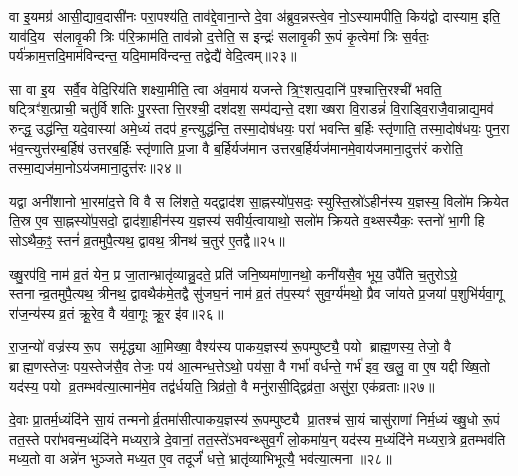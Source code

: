 वा इ॒यमग्र॑ आसी॒द्याव॒दासी॑नः परा॒पश्य॑ति॒ ताव॑द्दे॒वाना॒न्ते दे॒वा अ॑ब्रुव॒न्नस्त्वे॒व नो॒ऽस्यामपीति॒ किय॑द्वो दास्याम॒ इति॒ याव॑दि॒य स॑लावृ॒की त्रिः प॑रि॒क्राम॑ति॒ ताव॑न्नो द॒त्तेति॒ स इन्द्रः॑ सलावृ॒की रू॒पं कृ॒त्वेमां त्रिः स॒र्वतः॒ पर्य॑क्राम॒त्तदि॒माम॑विन्दन्त॒ यदि॒मामवि॑न्दन्त॒ तद्वेद्यै॑ वेदि॒त्वम्॥२३॥

सा वा इ॒य सर्वै॒व वेदि॒रिय॑ति शक्ष्या॒मीति॒ त्वा अ॑व॒माय॑ यजन्ते त्रि॒ꣳ॒शत्प॒दानि॑ प॒श्चात्ति॒रश्ची॑ भवति॒ षट्त्रिꣳ॑श॒त्प्राची॒ चतु॑र्विशतिः पु॒रस्तात्ति॒रश्ची॒ दश॑दश॒ सम्प॑द्यन्ते॒ दशाख्षरा वि॒राडन्नं॑ वि॒राड्वि॒राजै॒वान्नाद्य॒मव॑ रुन्द्ध॒ उद्ध॑न्ति॒ यदे॒वास्या॑ अमे॒ध्यं तदप॑ ह॒न्त्युद्ध॑न्ति॒ तस्मा॒दोष॑धयः॒ परा॑ भवन्ति ब॒र्\mbox{}हिः स्तृ॑णाति॒ तस्मा॒दोष॑धयः॒ पुन॒रा भ॑व॒न्त्युत्त॑रम्ब॒र्\mbox{}हिष॑ उत्तरब॒र्\mbox{}हिः स्तृ॑णाति प्र॒जा वै ब॒र्\mbox{}हिर्यज॑मान उत्तरब॒र्\mbox{}हिर्यज॑मानमे॒वाय॑जमाना॒दुत्त॑रं करोति॒ तस्मा॒द्यज॑मा॒नोऽय॑जमाना॒दुत्त॑रः॥२४॥

{\anuvakamend[{रु॒न्धे॒ वा॒म॒मो॒षो वे॑दि॒त्वमसु॑राणां वेदि॒त्वम्भ॑वन्ति॒ पञ्च॑विशतिश्च॥४॥}]}

यद्वा अनी॑शानो भा॒रमा॑द॒त्ते वि वै स लि॑शते॒ यद्द्वाद॑श सा॒ह्नस्यो॑प॒सदः॒ स्युस्ति॒स्रो॑ऽहीन॑स्य य॒ज्ञस्य॒ विलो॑म क्रियेत ति॒स्र ए॒व सा॒ह्नस्यो॑प॒सदो॒ द्वाद॑शा॒हीन॑स्य य॒ज्ञस्य॑ सवीर्य॒त्वायाथो॒ सलो॑म क्रियते व॒थ्सस्यैकः॒ स्तनो॑ भा॒गी हि सोऽथैक॒ꣵ॒ स्तनं॑ व्र॒तमुपै॒त्यथ॒ द्वावथ॒ त्रीनथ॑ च॒तुर॑ ए॒तद्वै॥२५॥

ख्षु॒रप॑वि॒ नाम॑ व्र॒तं येन॒ प्र जा॒तान्भ्रातृ॑व्यान्नु॒दते॒ प्रति॑ जनि॒ष्यमा॑णा॒नथो॒ कनी॑यसै॒व भूय॒ उपै॑ति च॒तुरोऽग्रे॒ स्तनान्व्र॒तमुपै॒त्यथ॒ त्रीनथ॒ द्वावथैक॑मे॒तद्वै सु॑जघ॒नं नाम॑ व्र॒तं त॑प॒स्यꣳ॑ सुव॒र्ग्य॑मथो॒ प्रैव जा॑यते प्र॒जया॑ प॒शुभि॑र्यवा॒गू रा॑ज॒न्य॑स्य व्र॒तं क्रू॒रेव॒ वै य॑वा॒गूः क्रू॒र इ॑व॥२६॥

रा॒ज॒न्यो॑ वज्र॑स्य रू॒प समृ॑द्ध्या आ॒मिख्षा॒ वैश्य॑स्य पाकय॒ज्ञस्य॑ रू॒पम्पुष्ट्यै॒ पयो ब्राह्म॒णस्य॒ तेजो॒ वै ब्राह्म॒णस्तेजः॒ पय॒स्तेज॑सै॒व तेजः॒ पय॑ आ॒त्मन्ध॒त्तेऽथो॒ पय॑सा॒ वै गर्भा॑ वर्धन्ते॒ गर्भ॑ इव॒ खलु॒ वा ए॒ष यद्दीख्षि॒तो यद॑स्य॒ पयो व्र॒तम्भव॑त्या॒त्मान॑मे॒व तद्व॑र्धयति॒ त्रिव्र॑तो॒ वै मनु॑रासी॒द्द्विव्र॑ता॒ असु॑रा॒ एक॑व्रताः॥२७॥

दे॒वाः प्रा॒तर्म॒ध्यंदि॑ने सा॒यं तन्मनोर्व्र॒तमा॑सीत्पाकय॒ज्ञस्य॑ रू॒पम्पुष्ट्यै प्रा॒तश्च॑ सा॒यं चासु॑राणां निर्म॒ध्यं ख्षु॒धो रू॒पं तत॒स्ते परा॑भवन्म॒ध्यंदि॑ने मध्यरा॒त्रे दे॒वानां॒ तत॒स्ते॑ऽभवन्थ्सुव॒र्गं लो॒कमा॑य॒न् यद॑स्य म॒ध्यंदि॑ने मध्यरा॒त्रे व्र॒तम्भव॑ति मध्य॒तो वा अन्ने॑न भुञ्जते मध्य॒त ए॒व तदूर्जं॑ धत्ते॒ भ्रातृ॑व्याभिभूत्यै॒ भव॑त्या॒त्मना॥२८॥

